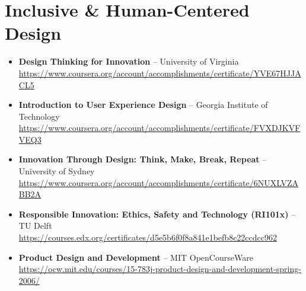 \documentclass[11pt,a4paper]{article}
\begin{document}
\section{Inclusive \& Human-Centered Design}
\begin{itemize}
    \item \textbf{Design Thinking for Innovation} – University of Virginia\\
    \url{https://www.coursera.org/account/accomplishments/certificate/YVE67HJJACL5}

    \item \textbf{Introduction to User Experience Design} – Georgia Institute of Technology\\
    \url{https://www.coursera.org/account/accomplishments/certificate/FVXDJKVFVEQ3}

    \item \textbf{Innovation Through Design: Think, Make, Break, Repeat} – University of Sydney\\
    \url{https://www.coursera.org/account/accomplishments/certificate/6NUXLVZABB2A}

    \item \textbf{Responsible Innovation: Ethics, Safety and Technology (RI101x)} – TU Delft\\
    \url{https://courses.edx.org/certificates/d5e5b6f0f8a841e1befb8c22ccdcc962}

    \item \textbf{Product Design and Development} – MIT OpenCourseWare\\
    \url{https://ocw.mit.edu/courses/15-783j-product-design-and-development-spring-2006/}
\end{itemize}
\end{document}
